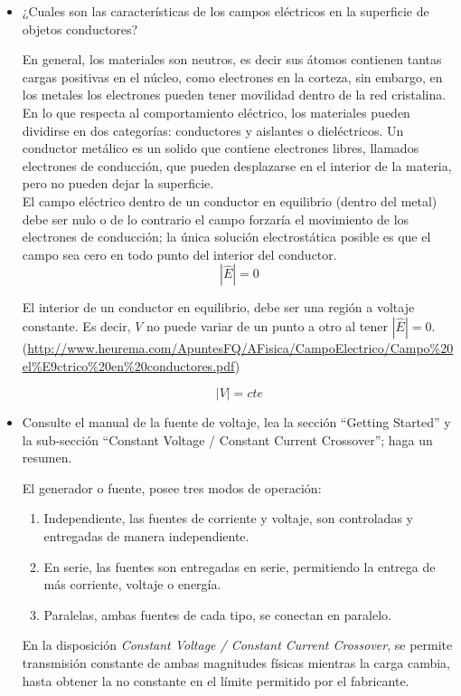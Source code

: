 \documentclass[DIV=calc, paper=a4, fontsize=11pt, twocolumn, spanish]{scrartcl}	 %
\begin{document}
\begin{itemize}
\item ¿Cuales son las características de los campos eléctricos en la superficie de objetos conductores?

En general, los materiales son neutros, es decir sus átomos contienen tantas cargas positivas en el núcleo, como electrones en la corteza, sin embargo, en los metales los electrones pueden tener movilidad dentro de la red cristalina.\\

 En lo que respecta al comportamiento eléctrico, los materiales pueden dividirse en dos categorías: conductores y aislantes o dieléctricos. Un conductor metálico es un solido que contiene electrones libres, llamados electrones de conducción, que pueden desplazarse en el interior de la materia, pero no pueden dejar la superficie.\\
 
 
El campo eléctrico dentro de un conductor en equilibrio (dentro del metal) debe ser nulo o de lo contrario el campo forzaría el movimiento de los electrones de conducción; la única solución electrostática posible es que el campo sea cero en todo punto del interior del conductor. \\

$$|\hat{E}| = 0$$

El interior de un conductor en equilibrio, debe ser una región a voltaje constante. Es decir, $V$ no puede variar de un punto a otro al tener $|\hat{E}| = 0$. (\url{http://www.heurema.com/ApuntesFQ/AFisica/CampoElectrico/Campo\%20el\%E9ctrico\%20en\%20conductores.pdf})

$$|V| = cte$$

\item Consulte el manual de la fuente de voltaje, lea la sección “Getting Started” y la sub-sección “Constant Voltage / Constant Current Crossover”; haga un resumen.

El generador o fuente, posee tres modos de operación: 

\begin{enumerate}
\item Independiente, las fuentes de corriente y voltaje, son controladas y entregadas de manera independiente.
\item En serie, las fuentes son entregadas en serie, permitiendo la entrega de más corriente, voltaje o energía.
\item Paralelas, ambas fuentes de cada tipo, se conectan en paralelo.
\end{enumerate}

En la disposición \textit{Constant Voltage / Constant Current Crossover}, se permite transmisión constante de ambas magnitudes físicas mientras la carga cambia, hasta obtener la no constante en el límite permitido por el fabricante.
\end{itemize}

\end{document}
